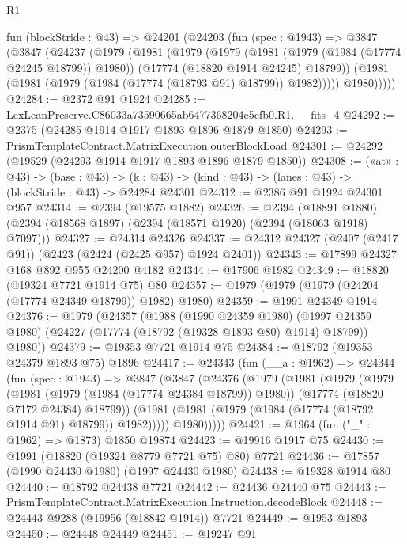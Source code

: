 \begin{lexlean}{R1}
\begin{coremodule}
  fun (blockStride : @43) =>
  @24201
    (@24203
      (fun (spec : @1943) =>
      @3847
        (@3847
          (@24237
            (@1979
              (@1981
                (@1979
                  (@1979
                    (@1981 (@1979 (@1984 (@17774 @24245 @18799)) @1980))
                    (@17774 (@18820 @1914 @24245) @18799))
                  (@1981 (@1981 (@1979 (@1984 (@17774 (@18793 @91) @18799)) @1982)))))
              @1980)))))
@24284 := @2372 @91 @1924
@24285 := LexLeanPreserve.C86033a73590665ab6477368204e5cfb0.R1.__fits_4
@24292 := @2375 (@24285 @1914 @1917 @1893 @1896 @1879 @1850)
@24293 := PrismTemplateContract.MatrixExecution.outerBlockLoad
@24301 := @24292 (@19529 (@24293 @1914 @1917 @1893 @1896 @1879 @1850))
@24308 := («at» : @43) ->
  (base : @43) -> (k : @43) -> (kind : @43) -> (lanes : @43) -> (blockStride : @43) -> @24284 @24301
@24312 := @2386 @91 @1924 @24301 @957
@24314 := @2394 (@19575 @1882)
@24326 := @2394
    (@18891 @1880)
    (@2394 (@18568 @1897) (@2394 (@18571 @1920) (@2394 (@18063 @1918) @7097)))
@24327 := @24314 @24326
@24337 := @24312 @24327 (@2407 (@2417 @91)) (@2423 (@2424 (@2425 @957) @1924 @2401))
@24343 := @17899 @24327 @168 @892 @955 @24200 @4182
@24344 := @17906 @1982
@24349 := @18820 (@19324 @7721 @1914 @75) @80
@24357 := @1979 (@1979 (@1979 (@24204 (@17774 @24349 @18799)) @1982) @1980)
@24359 := @1991 @24349 @1914
@24376 := @1979
    (@24357
      (@1988
        (@1990 @24359 @1980)
        (@1997 @24359 @1980)
        (@24227 (@17774 (@18792 (@19328 @1893 @80) @1914) @18799))
        @1980))
@24379 := @19353 @7721 @1914 @75
@24384 := @18792 (@19353 @24379 @1893 @75) @1896
@24417 := @24343
    (fun (__a : @1962) =>
    @24344
      (fun (spec : @1943) =>
      @3847
        (@3847
          (@24376
            (@1979
              (@1981
                (@1979
                  (@1979
                    (@1981 (@1979 (@1984 (@17774 @24384 @18799)) @1980))
                    (@17774 (@18820 @7172 @24384) @18799))
                  (@1981 (@1981 (@1979 (@1984 (@17774 (@18792 @1914 @91) @18799)) @1982)))))
              @1980)))))
@24421 := @1964 (fun ("_" : @1962) => @1873) @1850 @19874
@24423 := @19916 @1917 @75
@24430 := @1991 (@18820 (@19324 @8779 @7721 @75) @80) @7721
@24436 := @17857 (@1990 @24430 @1980) (@1997 @24430 @1980)
@24438 := @19328 @1914 @80
@24440 := @18792 @24438 @7721
@24442 := @24436 @24440 @75
@24443 := PrismTemplateContract.MatrixExecution.Instruction.decodeBlock
@24448 := @24443 @9288 (@19956 (@18842 @1914)) @7721
@24449 := @1953 @1893
@24450 := @24448 @24449
@24451 := @19247 @91

\end{coremodule}
\end{lexlean}
